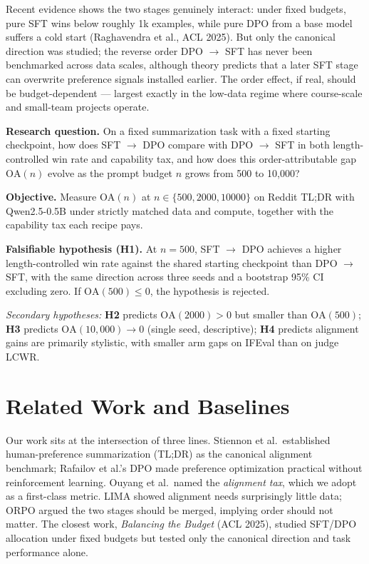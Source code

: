 \documentclass[11pt]{article}
\begin{document}
Recent evidence shows the two stages genuinely interact: under fixed budgets, pure SFT wins below roughly 1k examples, while pure DPO from a base model suffers a cold start (Raghavendra et al., ACL 2025). But only the canonical direction was studied; the reverse order DPO $\rightarrow$ SFT has never been benchmarked across data scales, although theory predicts that a later SFT stage can overwrite preference signals installed earlier. The order effect, if real, should be budget-dependent --- largest exactly in the low-data regime where course-scale and small-team projects operate.

\textbf{Research question.} On a fixed summarization task with a fixed starting checkpoint, how does SFT $\rightarrow$ DPO compare with DPO $\rightarrow$ SFT in both length-controlled win rate and capability tax, and how does this order-attributable gap $\mathrm{OA}(n)$ evolve as the prompt budget $n$ grows from 500 to 10{,}000?

\textbf{Objective.} Measure $\mathrm{OA}(n)$ at $n\in\{500, 2000, 10000\}$ on Reddit TL;DR with Qwen2.5-0.5B under strictly matched data and compute, together with the capability tax each recipe pays.

\textbf{Falsifiable hypothesis (H1).} At $n=500$, SFT $\rightarrow$ DPO achieves a higher length-controlled win rate against the shared starting checkpoint than DPO $\rightarrow$ SFT, with the same direction across three seeds and a bootstrap 95\% CI excluding zero. If $\mathrm{OA}(500)\le 0$, the hypothesis is rejected.

\emph{Secondary hypotheses:} \textbf{H2} predicts $\mathrm{OA}(2000)>0$ but smaller than $\mathrm{OA}(500)$; \textbf{H3} predicts $\mathrm{OA}(10{,}000)\rightarrow 0$ (single seed, descriptive); \textbf{H4} predicts alignment gains are primarily stylistic, with smaller arm gaps on IFEval than on judge LCWR.

\section{Related Work and Baselines}

Our work sits at the intersection of three lines. Stiennon et al.\ established human-preference summarization (TL;DR) as the canonical alignment benchmark; Rafailov et al.'s DPO made preference optimization practical without reinforcement learning. Ouyang et al.\ named the \emph{alignment tax}, which we adopt as a first-class metric. LIMA showed alignment needs surprisingly little data; ORPO argued the two stages should be merged, implying order should not matter. The closest work, \emph{Balancing the Budget} (ACL 2025), studied SFT/DPO allocation under fixed budgets but tested only the canonical direction and task performance alone.
\end{document}
